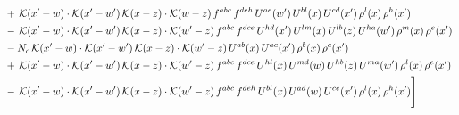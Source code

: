 \documentclass[9pt]{article}
\numberwithin{equation}{section}
\begin{document}
\begin{align}
& +\,\mathcal{K}(x'-w)\cdot\mathcal{K}(x'-w')\,\mathcal{K}(x-z)\cdot\mathcal{K}(w-z)\,f^{abc}\,f^{deh}\,U^{ae}(w')\,U^{bl}(x)\,U^{cd}(x')\,\rho^{l}(x)\,\rho^{h}(x')\notag\\
& -\,\mathcal{K}(x'-w)\cdot\mathcal{K}(x'-w')\,\mathcal{K}(x-z)\cdot\mathcal{K}(w'-z)\,f^{abc}\,f^{dce}\,U^{hd}(x')\,U^{lm}(x)\,U^{lb}(z)\,U^{ha}(w')\,\rho^{m}(x)\,\rho^{e}(x')\notag\\
& -N_{c}\,\mathcal{K}(x'-w)\cdot\mathcal{K}(x'-w')\,\mathcal{K}(x-z)\cdot\mathcal{K}(w'-z)\,U^{ab}(x)\,U^{ac}(x')\,\rho^{b}(x)\,\rho^{c}(x')\notag\\
& +\,\mathcal{K}(x'-w)\cdot\mathcal{K}(x'-w')\,\mathcal{K}(x-z)\cdot\mathcal{K}(w'-z)\,f^{abc}\,f^{dce}\,U^{hl}(x)\,U^{md}(w)\,U^{hb}(z)\,U^{ma}(w')\,\rho^{l}(x)\,\rho^{e}(x')\notag\\
& -\,\mathcal{K}(x'-w)\cdot\mathcal{K}(x'-w')\,\mathcal{K}(x-z)\cdot\mathcal{K}(w'-z)\,f^{abc}\,f^{deh}\,U^{bl}(x)\,U^{ad}(w)\,U^{ce}(x')\,\rho^{l}(x)\,\rho^{h}(x')\Bigg]
\end{align}
\end{document}
